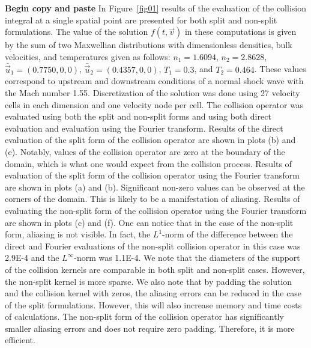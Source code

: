 \documentclass[12pt]{CSUNthesis}
\begin{document}
\textbf{Begin copy and paste} In Figure~\ref{fig01} results of the evaluation of the collision integral 
at a single spatial point are presented for both split and non-split 
formulations. The value of the solution $f(t,\vec{v})$ in these computations 
is given by the sum of two Maxwellian distributions with dimensionless 
densities, bulk velocities, and temperatures given as follows: $n_{1}=1.6094$, 
$n_{2}=2.8628$, $\bar{\vec{u}}_{1}=(0.7750,0,0)$, $\bar{\vec{u}}_{2}=(0.4357,0,0)$,
$T_{1}=0.3$, and $T_{2}=0.464$. These values correspond to upstream and downstream conditions
of a normal shock wave with the Mach number 1.55. Discretization of the solution was done using 
27 velocity cells in each dimension and one velocity node per cell. The collision operator was 
evaluated using both the split and non-split forms and using both direct evaluation and evaluation 
using the Fourier transform. Results of the direct evaluation of the 
split form of the collision operator are shown in plots (b) and (e). Notably, values 
of the collision operator are zero at the 
boundary of the domain, which is what one would expect from the collision process. Results 
of evaluation of the split form of the collision operator using the Fourier transform are shown in plots (a) and (b). 
Significant non-zero values can be observed at the corners of the domain. This is likely to be 
a manifestation of aliasing. Results of evaluating the non-split form of the collision 
operator using the Fourier transform are shown in plots (c) and (f). One can notice that 
in the case of the non-split form, aliasing is not visible. In fact, the 
$L^{1}$-norm of the difference between the direct and Fourier
evaluations of the non-split collision operator in this case was 2.9E-4 and 
the $L^{\infty}$-norm was 
1.1E-4. We note that the diameters of the support of the collision kernels 
are comparable in both split and non-split cases. However, the non-split kernel is 
more sparse. We also note that by padding the solution and the collision kernel with zeros, 
the aliasing errors can be reduced in the case of the split formulations. However, 
this will also increase memory and time costs of calculations. The non-split form 
of the collision operator has significantly smaller aliasing errors and does not 
require zero padding. Therefore, it is more efficient. 
\end{document}
